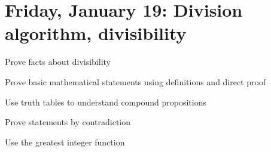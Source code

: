 \documentclass{ximera}
\begin{document}

\section{Friday, January 19: Division algorithm, divisibility}%

\begin{obj}
\item Prove facts about divisibility
\item Prove basic mathematical statements using definitions and direct proof
\item Use truth tables to understand compound propositions
\item Prove statements by contradiction
\item Use the greatest integer function
 \end{obj}
 
\end{document}
